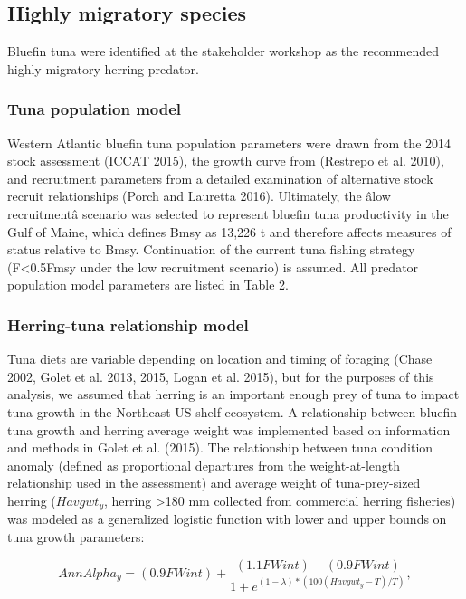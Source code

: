 \documentclass[]{article}
\begin{document}
\subsection{Highly migratory species}\label{highly-migratory-species}

Bluefin tuna were identified at the stakeholder workshop as the
recommended highly migratory herring predator.

\subsubsection{Tuna population model}\label{tuna-population-model}

Western Atlantic bluefin tuna population parameters were drawn from the
2014 stock assessment (ICCAT 2015), the growth curve from (Restrepo et
al. 2010), and recruitment parameters from a detailed examination of
alternative stock recruit relationships (Porch and Lauretta 2016).
Ultimately, the âlow recruitmentâ scenario was selected to represent
bluefin tuna productivity in the Gulf of Maine, which defines Bmsy as
13,226 t and therefore affects measures of status relative to Bmsy.
Continuation of the current tuna fishing strategy (F\textless{}0.5Fmsy
under the low recruitment scenario) is assumed. All predator population
model parameters are listed in Table 2.

\subsubsection{Herring-tuna relationship
model}\label{herring-tuna-relationship-model}

Tuna diets are variable depending on location and timing of foraging
(Chase 2002, Golet et al. 2013, 2015, Logan et al. 2015), but for the
purposes of this analysis, we assumed that herring is an important
enough prey of tuna to impact tuna growth in the Northeast US shelf
ecosystem. A relationship between bluefin tuna growth and herring
average weight was implemented based on information and methods in Golet
et al. (2015). The relationship between tuna condition anomaly (defined
as proportional departures from the weight-at-length relationship used
in the assessment) and average weight of tuna-prey-sized herring
(\(Havgwt_{y}\), herring \textgreater{}180 mm collected from commercial
herring fisheries) was modeled as a generalized logistic function with
lower and upper bounds on tuna growth parameters:

\begin{equation}
AnnAlpha_{y} = (0.9 FWint) + \frac{(1.1 FWint) - (0.9 FWint)}{1+e^{(1-\lambda)*(100(Havgwt_{y}-T)/T)}} \label{tunagrow_equation},
\end{equation}
\end{document}
